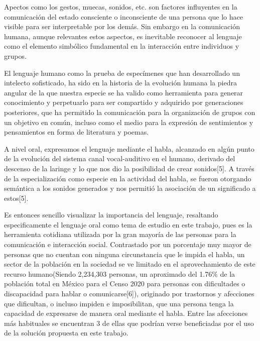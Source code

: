\hfill \break
\justifying
Apectos como los gestos, muecas, sonidos, etc. son factores influyentes en la comunicación del estado consciente o inconsciente de una persona que lo hace visible para ser interpretable por los demás. Sin embargo en la comunicación humana, aunque relevantes estos aspectos, es inevitable reconocer al lenguaje como el elemento simbólico fundamental en la interacción entre individuos y grupos.

\hfill \break
\justifying
El lenguaje humano como la prueba de especímenes que han desarrollado un intelecto sofisticado, ha sido en la historia de la evolución humana la piedra angular de la que nuestra especie se ha valido como herramienta para generar conocimiento y perpetuarlo para ser compartido y adquirido por generaciones posteriores, que ha permitido la comunicación para la organización de grupos con un objetivo en común, incluso como el medio para la expresión de sentimientos y pensamientos en forma de literatura y poemas.

\hfill \break
\justifying
A nivel oral, expresamos el lenguaje mediante el habla, alcanzado en algún punto de la evolución del sistema canal vocal-auditivo en el humano, derivado del descenso de la laringe y lo que nos dio la posibilidad de crear sonidos[5]. A través de la especialización como especie en la actividad del habla, se fueron otorgando semántica a los sonidos generados y nos permitió la asociación de un significado a estos[5].

\hfill \break
\justifying
Es entonces sencillo visualizar la importancia del lenguaje, resaltando especificamente el lenguaje oral como tema de estudio en este trabajo, pues es la herramienta cotidiana utilizada por la gran mayoría de las personas para la comunicación e interacción social. Contrastado por un porcentaje muy mayor de personas que no cuentan con ninguna circunstancia que le impida el habla, un sector de la población en la sociedad se ve limitado en el aprovechamiento de este recurso humano(Siendo 2,234,303 personas, un aproximado del 1.76\% de la población total en México para el Censo 2020 para personas con dificultades o discapacidad para hablar o comunicarse[6]), originado por trastornos y afecciones que dificultan, o incluso impiden e imposibilitan, que una persona tenga la capacidad de expresarse de manera oral mediante el habla.
Entre las afecciones más habituales se encuentran 3 de ellas que podrían verse beneficiadas por el uso de la solución propuesta en este trabajo.

